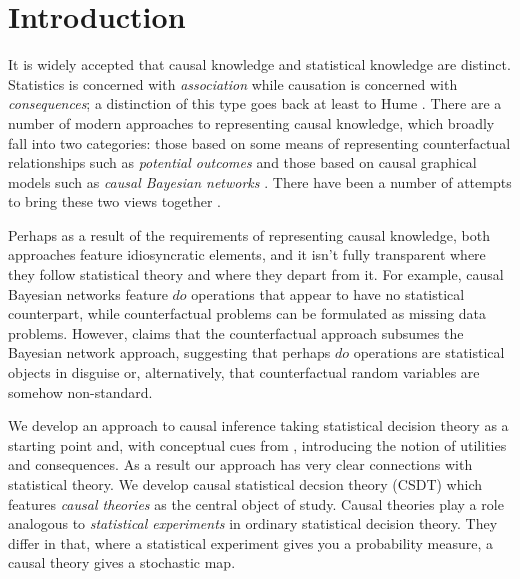 
\section{Introduction}

\vspace{-3mm}

It is widely accepted that causal knowledge and statistical knowledge are distinct. Statistics is concerned with \emph{association} while causation is concerned with \emph{consequences}; a distinction of this type goes back at least to Hume \citep{morris_david_2019}. There are a number of modern approaches to representing causal knowledge, which broadly fall into two categories: those based on some means of representing counterfactual relationships such as \emph{potential outcomes} \citep{rubin_causal_2005} and those based on causal graphical models such as \emph{causal Bayesian networks} \citep{pearl_causality:_2009}. There have been a number of attempts to bring these two views together \cite{richardson2013single,shpitser_complete_2008}. 

Perhaps as a result of the requirements of representing causal knowledge, both approaches feature idiosyncratic elements, and it isn't fully transparent where they follow statistical theory and where they depart from it. For example, causal Bayesian networks feature $do$ operations that appear to have no statistical counterpart, while counterfactual problems can be formulated as missing data problems. However, \citet{pearl_causality:_2009} claims that the counterfactual approach subsumes the Bayesian network approach, suggesting that perhaps $do$ operations are statistical objects in disguise or, alternatively, that counterfactual random variables are somehow non-standard. 

We develop an approach to causal inference taking statistical decision theory \citep{wald_statistical_1950} as a starting point and, with conceptual cues from \citet{savage_foundations_1972}, introducing the notion of utilities and consequences. As a result our approach has very clear connections with statistical theory. We develop causal statistical decsion theory (CSDT) which features \emph{causal theories} as the central object of study. Causal theories play a role analogous to \emph{statistical experiments} in ordinary statistical decision theory. They differ in that, where a statistical experiment gives you a probability measure, a causal theory gives a stochastic map.

